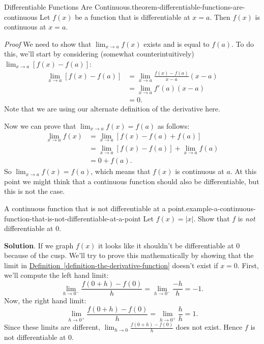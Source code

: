 \documentclass[10pt,]{book}
\makeatletter
\renewcommand*{\proofname}{Proof}
\renewenvironment{proof}[1][\proofname]{\par
  \pushQED{\qed}%
  \normalfont \topsep6\p@\@plus6\p@\relax
  \trivlist
  \item\relax
    {\itshape
    #1\@addpunct{.}}\hspace\labelsep\ignorespaces
}{%
  \popQED\endtrivlist\@endpefalse
}
\numberwithin{equation}{section}
\makeatother
\begin{document}
\begin{theorem}{Differentiable Functions Are Continuous.}{}{theorem-differentiable-functions-are-continuous}%
\hypertarget{p-109}{}%
Let \(f(x)\) be a function that is differentiable at \(x=a\). Then \(f(x)\) is continuous at \(x=a\).%
\end{theorem}
\begin{proof}\hypertarget{proof-1}{}
\hypertarget{p-110}{}%
We need to show that \(\lim_{x\to a}f(x)\) exists and is equal to \(f(a)\). To do this, we'll start by considering (somewhat counterintuitively) \(\lim_{x\to a}[f(x)-f(a)]\):%
\begin{align*}
\lim_{x\to a}[f(x)-f(a)] & = \lim_{x\to a}\frac{f(x)-f(a)}{x-a}(x-a) \\
& = \lim_{x\to a}f'(a)(x-a) \\
& = 0. 
\end{align*}
Note that we are using our alternate definition of the derivative here.%
\par
\hypertarget{p-111}{}%
Now we can prove that \(\lim_{x\to a}f(x) = f(a)\) as follows:%
\begin{align*}
\lim_{x\to a}f(x) & = \lim_{x\to a}[f(x) - f(a) + f(a)] \\
& = \lim_{x\to a}[f(x)-f(a)] + \lim_{x\to a}f(a) \\
& = 0 + f(a). 
\end{align*}
So \(\lim_{x\to a}f(x) = f(a)\), which means that \(f(x)\) is continuous at \(a\).%
\end{proof}
\hypertarget{p-112}{}%
At this point we might think that a continuous function should also be differentiable, but this is not the case.%
\begin{example}{A continuous function that is not differentiable at a point.}{example-a-continuous-function-that-is-not-differentiable-at-a-point}%
\hypertarget{p-113}{}%
Let \(f(x) = |x|\). Show that \(f\) is \emph{not} differentiable at \(0\).%
\par\smallskip%
\noindent\textbf{Solution}.\hypertarget{solution-24}{}\quad%
\hypertarget{p-114}{}%
If we graph \(f(x)\) it looks like it shouldn't be differentiable at \(0\) because of the cusp. We'll try to prove this mathematically by showing that the limit in \hyperref[definition-the-derivative-function]{Definition~\ref{definition-the-derivative-function}} doesn't exist if \(x=0\). First, we'll compute the left hand limit:%
\begin{equation*}
\lim_{h\to0^{-}}\frac{f(0+h)-f(0)}{h} = \lim_{h\to0^{-}}\frac{-h}{h} = -1.
\end{equation*}
Now, the right hand limit:%
\begin{equation*}
\lim_{h\to0^{+}}\frac{f(0+h)-f(0)}{h} = \lim_{h\to0^{+}}\frac{h}{h} = 1.
\end{equation*}
Since these limits are different, \(\lim_{h\to0}\frac{f(0+h)-f(0)}{h}\) does not exist. Hence \(f\) is not differentiable at \(0\).%
\end{example}
\end{document}
